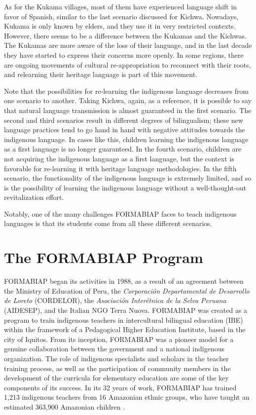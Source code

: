 \documentclass[output=paper]{langscibook}
\begin{document}
As for the Kukama villages, most of them have experienced language shift in favor of Spanish, similar to the last scenario discussed for Kichwa. Nowadays, Kukama is only known by elders, and they use it in very restricted contexts. However, there seems to be a difference between the Kukamas and the Kichwas. The Kukamas are more aware of the loss of their language, and in the last decade they have started to express their concerns more openly. In some regions, there are ongoing movements of cultural re-appropriation to reconnect with their roots, and relearning their heritage language is part of this movement.

Note that the possibilities for re-learning the indigenous language decreases from one scenario to another. Taking Kichwa, again, as a reference, it is possible to say that natural language transmission is almost guaranteed in the first scenario. The second and third scenarios result in different degrees of bilingualism; these new language practices tend to go hand in hand with negative attitudes towards the indigenous language. In cases like this, children learning the indigenous language as a first language is no longer guaranteed. In the fourth scenario, children are not acquiring the indigenous language as a first language, but the context is favorable for re\nobreakdash-learning it with heritage language methodologies. In the fifth scenario, the functionality of the indigenous language is extremely limited, and so is the possibility of learning the indigenous language without a well-thought-out revitalization effort.

Notably, one of the many challenges FORMABIAP faces to teach indigenous languages is that its students come from all these different scenarios.

\section{The FORMABIAP Program}\label{sec:7:3}

FORMABIAP began its activities in 1988, as a result of an agreement between the Ministry of Education of Peru, the \textit{Corporación Departamental de Desarrollo de Loreto} (CORDELOR), the \textit{Asociación Interétnica de la Selva Peruana} (AIDESEP), and the Italian NGO Terra Nuova. FORMABIAP was created as a program to train indigenous teachers in intercultural bilingual education (IBE) within the framework of a Pedagogical Higher Education Institute, based in the city of Iquitos. From its inception, FORMABIAP was a pioneer model for a genuine collaboration between the government and a national indigenous organization. The role of indigenous specialists and scholars in the teacher training process, as well as the participation of community members in the development of the curricula for elementary education are some of the key components of its success. In its 32 years of work, FORMABIAP has trained 1,213 indigenous teachers from 16 Amazonian ethnic groups, who have taught an estimated 363,900 Amazonian children \citep{TrapnellEtAl2018}.
\end{document}
